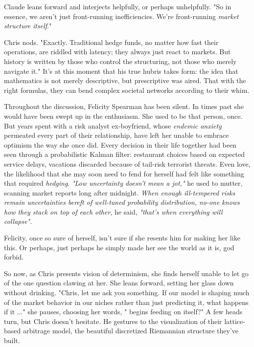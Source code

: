 \smallskip

Claude leans forward and interjects helpfully, or perhaps unhelpfully. "So in essence, we aren’t just front-running inefficiencies. We’re front-running \textit{market structure itself}."

\smallskip

Chris nods. "Exactly. Traditional hedge funds, no matter how fast their operations, are riddled with latency; they always just react to markets. But history is written by those who control the structuring, not those who merely navigate it." It’s at this moment that his true hubris takes form: the idea that mathematics is not merely descriptive, but prescriptive was aired. That with the right formulas, they can bend complex societal networks according to their whim. 

\smallskip

Throughout the discussion, Felicity Spearman has been silent. In times past she would have been swept up in the enthusiasm. She used to be that person, once. But years spent with a risk analyst ex-boyfriend, whose \textit{endemic anxiety} permeated every part of their relationship, have left her unable to embrace optimism the way she once did. Every decision in their life together had been seen through a probabilistic Kalman filter: restaurant choices based on expected service delays, vacations discarded because of tail-risk terrorist threats. Even love, the likelihood that she may soon need to fend for herself had felt like something that required \textit{hedging}.  \textit{"Low uncertainty doesn’t mean a jot,"} he used to mutter, scanning market reports long after midnight. \textit{When enough ill-tempered risks remain uncertainties bereft of well-tuned probability distribution, no-one knows how they stack on top of each other}, he said, \textit{"that’s when everything will collapse"}. 

\smallskip

Felicity, once so sure of herself, isn’t sure if she resents him for making her like this. Or perhaps, just perhaps he simply made her see the world as it is, god forbid.

\smallskip

So now, as Chris presents vision of determinism, she finds herself unable to let go of the one question clawing at her. She leans forward, setting her glass down without drinking. "Chris, let me ask you something. If our model is shaping much of the market behavior in our niches rather than just predicting it, what happens if it ..." she pauses, choosing her words, " begins feeding on itself?" A few heads turn, but Chris doesn’t hesitate. He gestures to the visualization of their lattice-based arbitrage model, the beautiful discretized Riemannian structure they’ve built.

